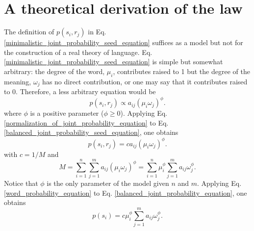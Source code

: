 \documentclass{article}
\begin{document}
\section*{A theoretical derivation of the law}

The definition of $p(s_i, r_j)$ in Eq. \ref{minimalistic_joint_probability_seed_equation} suffices as a model but not for the construction of a real theory of language. Eq. \ref{minimalistic_joint_probability_seed_equation} is simple but somewhat arbitrary: the degree of the word, $\mu_i$, contributes raised to 1 but the degree of the meaning, $\omega_j$ has no direct contribution, or one may say that it contributes raised to 0. Therefore, a less arbitrary equation would be  
\begin{equation}
p(s_i, r_j) \propto a_{ij} (\mu_i \omega_j)^\phi.
\label{balanced_joint_probability_seed_equation}
\end{equation}
where $\phi$ is a positive parameter ($\phi \geq 0$).  
Applying Eq. \ref{normalization_of_joint_probability_equation} to Eq. \ref{balanced_joint_probability_seed_equation}, one obtains
\begin{equation}
p(s_i, r_j) = c a_{ij} (\mu_i \omega_j)^\phi.
\label{balanced_joint_probability_equation}
\end{equation}
with $c = 1/M$ and 
\begin{equation}
M = \sum_{i=1}^n \sum_{j=1}^m a_{ij} (\mu_i \omega_j)^\phi = \sum_{i=1}^n \mu_i^\phi \sum_{j=1}^m a_{ij} \omega_j^\phi.
\label{total_equation}
\end{equation}
Notice that $\phi$ is the only parameter of the model given $n$ and $m$.
Applying Eq. \ref{word_probability_equation} to Eq. \ref{balanced_joint_probability_equation}, one obtains
\begin{equation}
p(s_i) = c \mu_i^\phi \sum_{j=1}^m a_{ij}\omega_j^\phi. 
\label{new_word_probability_equation}
\end{equation}
\end{document}
